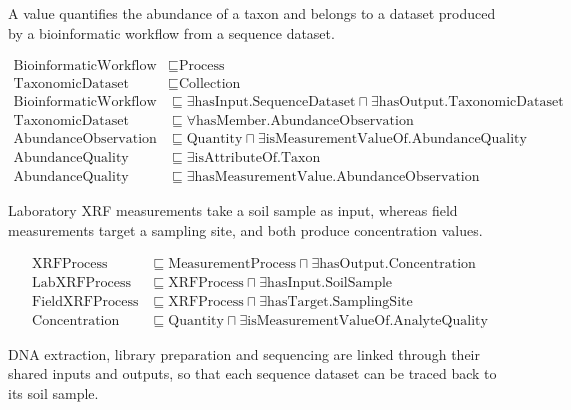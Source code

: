 \begin{revision}
A value quantifies the abundance of a taxon and belongs to a dataset
produced by a bioinformatic workflow from a sequence dataset.

\begin{small}
\begin{align}
	\label{eq:taxabundance}
	\text{BioinformaticWorkflow} & \sqsubseteq \text{Process} \\
	\text{TaxonomicDataset} & \sqsubseteq \text{Collection} \\
	\text{BioinformaticWorkflow} & \sqsubseteq \exists
	    \text{hasInput}.\text{SequenceDataset} \sqcap \exists
	    \text{hasOutput}.\text{TaxonomicDataset} \\
	\text{TaxonomicDataset} & \sqsubseteq \forall
	    \text{hasMember}.\text{AbundanceObservation} \\
	\text{AbundanceObservation} & \sqsubseteq \text{Quantity} \sqcap
	    \exists \text{isMeasurementValueOf}.\text{AbundanceQuality} \\
	\text{AbundanceQuality} & \sqsubseteq \exists
	    \text{isAttributeOf}.\text{Taxon} \\
	\text{AbundanceQuality} & \sqsubseteq \exists
	    \text{hasMeasurementValue}.\text{AbundanceObservation}
\end{align}
\end{small}

Laboratory XRF measurements take a soil sample as input, whereas field measurements target a sampling site, and both produce concentration values.

\begin{small}
\begin{align}
\label{eq:xrf}
\text{XRFProcess} & \sqsubseteq \text{MeasurementProcess}
  \sqcap \exists \text{hasOutput}.\text{Concentration} \\
\text{LabXRFProcess} & \sqsubseteq
  \text{XRFProcess} \sqcap \exists
  \text{hasInput}.\text{SoilSample} \\
\text{FieldXRFProcess} & \sqsubseteq
  \text{XRFProcess} \sqcap \exists
  \text{hasTarget}.\text{SamplingSite} \\
\text{Concentration} & \sqsubseteq \text{Quantity} \sqcap
  \exists \text{isMeasurementValueOf}.\text{AnalyteQuality}
\end{align}
\end{small}

DNA extraction, library preparation and sequencing are linked through their shared inputs and outputs, so that each sequence dataset can be traced back to its soil sample.


\end{revision}
